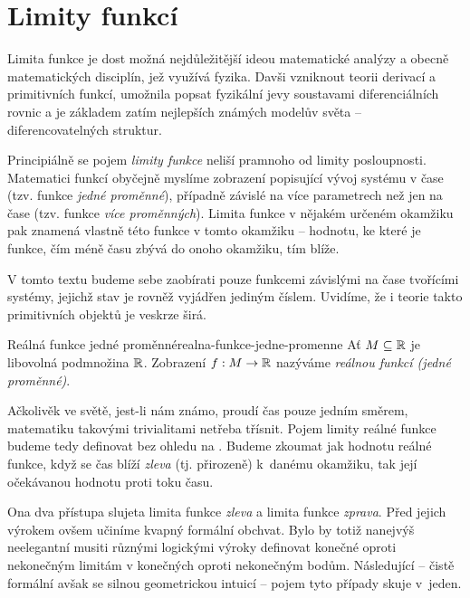 \chapter{Limity funkcí}
\label{chap:limity-funkci}

Limita funkce je dost možná nejdůležitější ideou matematické analýzy a obecně
matematických disciplín, jež využívá fyzika. Davši vzniknout teorii derivací a
primitivních funkcí, umožnila popsat fyzikální jevy soustavami diferenciálních
rovnic a je základem zatím nejlepších známých modelův světa --
diferencovatelných struktur.

Principiálně se pojem \emph{limity funkce} neliší pramnoho od limity
posloupnosti. Matematici funkcí obyčejně myslíme zobrazení popisující vývoj
systému v čase (tzv. funkce \emph{jedné proměnné}), případně závislé na více
parametrech než jen na čase (tzv. funkce \emph{více proměnných}). Limita funkce
v nějakém určeném okamžiku pak znamená vlastně  této
funkce v tomto okamžiku -- hodnotu, ke které je funkce, čím méně času zbývá do
onoho okamžiku, tím blíže.

V tomto textu budeme sebe zaobírati pouze funkcemi závislými na čase tvořícími
systémy, jejichž stav je rovněž vyjádřen jediným číslem. Uvidíme, že i teorie
takto primitivních objektů je veskrze širá.

\begin{definition}{Reálná funkce jedné proměnné}{realna-funkce-jedne-promenne}
 Ať $M \subseteq \mathbb{R}$ je libovolná podmnožina $\mathbb{R}$. Zobrazení $f:M \to \mathbb{R}$
 nazýváme \emph{reálnou funkcí (jedné proměnné)}.
\end{definition}

Ačkolivěk ve světě, jest-li nám známo, proudí čas pouze jedním směrem,
matematiku takovými trivialitami netřeba třísnit. Pojem limity reálné funkce
budeme tedy definovat bez ohledu na . Budeme zkoumat jak hodnotu
reálné funkce, když se čas blíží \emph{zleva} (tj. přirozeně) k~danému okamžiku,
tak její očekávanou hodnotu proti toku času.

Ona dva přístupa slujeta limita funkce \emph{zleva} a limita funkce
\emph{zprava}. Před jejich výrokem ovšem učiníme kvapný formální obchvat. Bylo
by totiž nanejvýš neelegantní musiti různými logickými výroky definovat konečné
oproti nekonečným limitám v konečných oproti nekonečným bodům. Následující --
čistě formální avšak se silnou geometrickou intuicí -- pojem tyto případy
skuje v~jeden.


